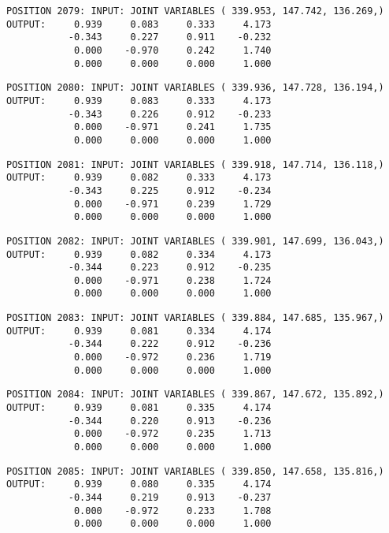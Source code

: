 \begin{verbatim}
POSITION 2079: INPUT: JOINT VARIABLES ( 339.953, 147.742, 136.269,)
OUTPUT:     0.939     0.083     0.333     4.173
           -0.343     0.227     0.911    -0.232
            0.000    -0.970     0.242     1.740
            0.000     0.000     0.000     1.000
\end{verbatim} \pagebreak[1]\begin{verbatim}
POSITION 2080: INPUT: JOINT VARIABLES ( 339.936, 147.728, 136.194,)
OUTPUT:     0.939     0.083     0.333     4.173
           -0.343     0.226     0.912    -0.233
            0.000    -0.971     0.241     1.735
            0.000     0.000     0.000     1.000
\end{verbatim} \pagebreak[1]\begin{verbatim}
POSITION 2081: INPUT: JOINT VARIABLES ( 339.918, 147.714, 136.118,)
OUTPUT:     0.939     0.082     0.333     4.173
           -0.343     0.225     0.912    -0.234
            0.000    -0.971     0.239     1.729
            0.000     0.000     0.000     1.000
\end{verbatim} \pagebreak[1]\begin{verbatim}
POSITION 2082: INPUT: JOINT VARIABLES ( 339.901, 147.699, 136.043,)
OUTPUT:     0.939     0.082     0.334     4.173
           -0.344     0.223     0.912    -0.235
            0.000    -0.971     0.238     1.724
            0.000     0.000     0.000     1.000
\end{verbatim} \pagebreak[1]\begin{verbatim}
POSITION 2083: INPUT: JOINT VARIABLES ( 339.884, 147.685, 135.967,)
OUTPUT:     0.939     0.081     0.334     4.174
           -0.344     0.222     0.912    -0.236
            0.000    -0.972     0.236     1.719
            0.000     0.000     0.000     1.000
\end{verbatim} \pagebreak[1]\begin{verbatim}
POSITION 2084: INPUT: JOINT VARIABLES ( 339.867, 147.672, 135.892,)
OUTPUT:     0.939     0.081     0.335     4.174
           -0.344     0.220     0.913    -0.236
            0.000    -0.972     0.235     1.713
            0.000     0.000     0.000     1.000
\end{verbatim} \pagebreak[1]\begin{verbatim}
POSITION 2085: INPUT: JOINT VARIABLES ( 339.850, 147.658, 135.816,)
OUTPUT:     0.939     0.080     0.335     4.174
           -0.344     0.219     0.913    -0.237
            0.000    -0.972     0.233     1.708
            0.000     0.000     0.000     1.000
\end{verbatim} \pagebreak[1]\begin{verbatim}

\end{verbatim}
